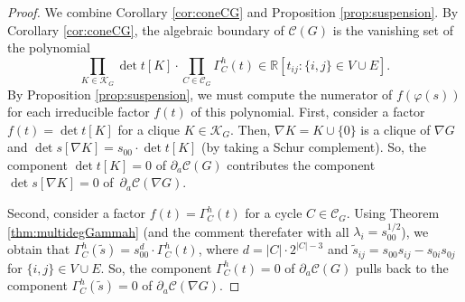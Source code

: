 \documentclass[a4paper, 11pt, twoside]{article}
\newcommand{\R}{\mathbb{R}}
\newcommand{\MK}{{\mathcal K}}
\newcommand{\MC}{{\mathcal C}}
\newcommand{\MCscr}{{\mathscr {C}}}
\theoremstyle{plain}
\begin{document}
\begin{proof}
    We combine Corollary \ref{cor:coneCG} and Proposition \ref{prop:suspension}.
        By Corollary \ref{cor:coneCG},  the algebraic boundary of $\mathscr{C}(G)$ is the vanishing set of the polynomial \[ \prod_{K\in\MK_G} \det t[K] \cdot \prod_{C\in\MC_G}\Gamma_C^h(t)\in \R[t_{ij}: \{i,j\}\in V\cup E]. \] 
        By Proposition \ref{prop:suspension}, we must compute the numerator of $f(\varphi(s))$ for each irreducible factor $f(t)$ of this polynomial. 
    First, consider a factor $f(t)= \det t[K]$ for a clique  $K\in\MK_G$. Then, $\nabla K=K\cup \{0\}$ is a clique of $\nabla G$ and   $\det s[\nabla K]=s_{00}\cdot \det t[K]$ (by taking a Schur complement). So, the component  $\det t[K]=0$ of $\partial_a\MCscr (G)$ contributes the component $\det s[\nabla K]=0$ of~$\partial _a\MCscr(\nabla G)$.
    
    Second, consider a factor $f(t)= \Gamma_C^h(t)$ for a cycle $C\in\MC_G$. 
    Using Theorem \ref{thm:multidegGammah} (and the comment therefater with all $\lambda_i=s_{00}^{1/2}$), we obtain that 
    $\Gamma^h_C(\tilde s)= s_{00}^d\cdot \Gamma_C^h(t)$, where $d=|C|\cdot 2^{|C|-3}$ and $\tilde s_{ij}=s_{00}s_{ij}-s_{0i}s_{0j}$ for $\{i,j\}\in V\cup E$. So, the component  $\Gamma_C^h(t)=0$ of $\partial_a \MCscr (G)$ pulls back to the component  $\Gamma^h_C(\tilde s)=0$ of $\partial_a\MCscr (\nabla G)$. 
\end{proof}
\end{document}
